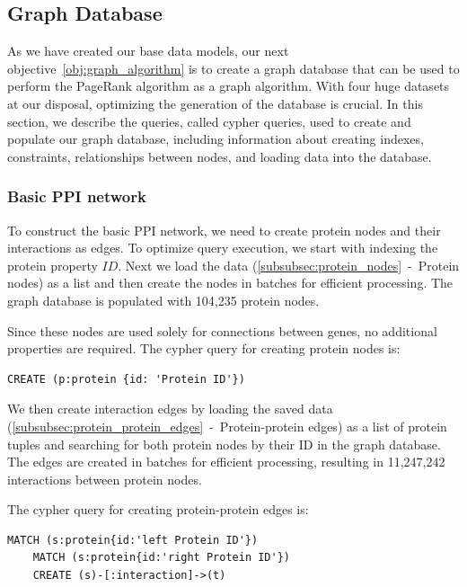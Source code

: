 \subsection{Graph Database} \label{subsec:graph_database}

As we have created our base data models, our next objective~\ref{obj:graph_algorithm} is to create a graph database
that can be used to perform the PageRank algorithm as a graph algorithm.
With four huge datasets at our disposal, optimizing the generation of the database is crucial.
In this section, we describe the queries, called cypher queries, used to create and populate our graph database,
including information about creating indexes, constraints, relationships between nodes, and loading data into the database.\\


\subsubsection*{Basic PPI network} \label{subsubsec:basic_ppi_network}
To construct the basic PPI network, we need to create protein nodes and their interactions as edges.
To optimize query execution, we start with indexing the protein property $ID$.
Next we load the data (\cref{subsubsec:protein_nodes}~-~Protein nodes) as a list and then create the nodes in batches for efficient processing.
The graph database is populated with 104,235 protein nodes.

Since these nodes are used solely for connections between genes, no additional properties are required.
The cypher query for creating protein nodes is:
\begin{lstlisting}[language=Cypher, label={lst:protein_nodes}]
    CREATE (p:protein {id: 'Protein ID'})
\end{lstlisting}
\vspace{\baselineskip}

We then create interaction edges by loading the saved data (\cref{subsubsec:protein_protein_edges}~-~Protein-protein edges)
as a list of protein tuples and searching for both protein nodes by their ID in the graph database.
The edges are created in batches for efficient processing, resulting in 11,247,242 interactions between protein nodes.

The cypher query for creating protein-protein edges is:
\begin{lstlisting}[language=Cypher, label={lst:protein_edges}]
    MATCH (s:protein{id:'left Protein ID'})
    MATCH (s:protein{id:'right Protein ID'})
    CREATE (s)-[:interaction]->(t)
\end{lstlisting}

